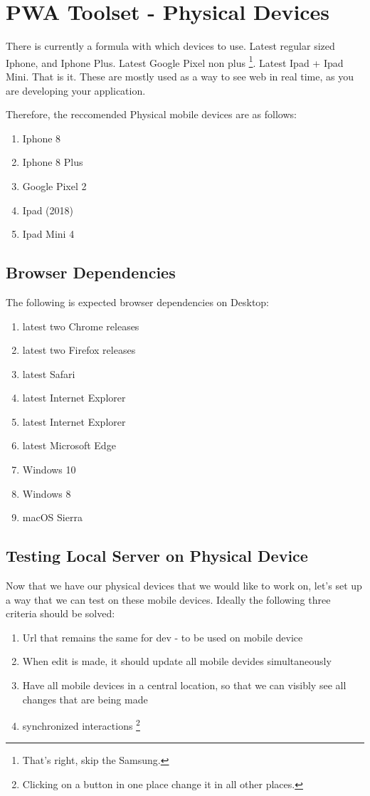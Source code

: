
\chapter{ PWA Toolset - Physical Devices }

There is currently a formula with which devices to use. Latest regular sized
Iphone, and Iphone Plus. Latest Google Pixel non plus
\footnote{That's right, skip the Samsung.}. Latest Ipad + Ipad Mini. That
is it. These are mostly used as a way to see web in real time, as you are
developing your application.

Therefore, the reccomended Physical mobile devices are as follows:
\begin{enumerate}
  \item Iphone 8
  \item Iphone 8 Plus
  \item Google Pixel 2
  \item Ipad (2018)
  \item Ipad Mini 4
\end{enumerate}

\section{ Browser Dependencies }

The following is expected browser dependencies on Desktop:
\begin{enumerate}
  \item latest two Chrome releases
  \item latest two Firefox releases
  \item latest Safari
  \item latest Internet Explorer
  \item latest Internet Explorer
  \item latest Microsoft Edge
  \item Windows 10
  \item Windows 8
  \item macOS Sierra
\end{enumerate}

\section{ Testing Local Server on Physical Device }

Now that we have our physical devices that we would like to work on, let's set
up a way that we can test on these mobile devices. Ideally the following three
criteria should be solved:
\begin{enumerate}
  \item Url that remains the same for dev - to be used on mobile device
  \item When edit is made, it should update all mobile devides simultaneously
  \item Have all mobile devices in a central location, so that we can visibly
  see all changes that are being made
  \item synchronized interactions \footnote{Clicking on a button in one place
  change it in all other places.}
\end{enumerate}

